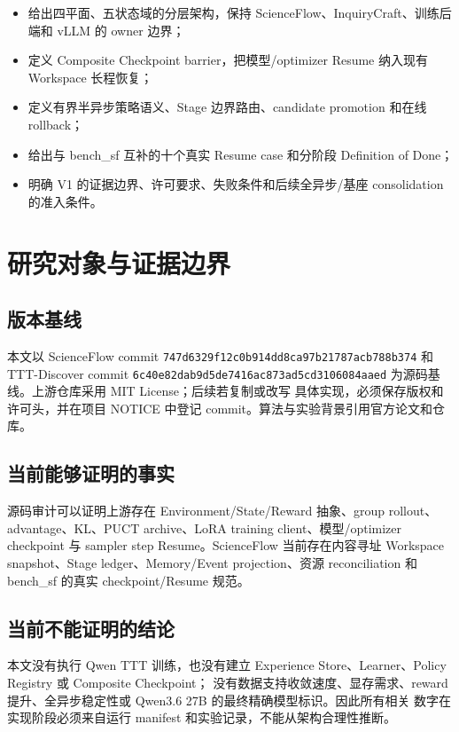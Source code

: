 \documentclass[UTF8,11pt,a4paper]{ctexart}
\begin{document}
\begin{itemize}
  \item 给出四平面、五状态域的分层架构，保持 ScienceFlow、InquiryCraft、训练后端和 vLLM 的 owner 边界；
  \item 定义 Composite Checkpoint barrier，把模型/optimizer Resume 纳入现有 Workspace 长程恢复；
  \item 定义有界半异步策略语义、Stage 边界路由、candidate promotion 和在线 rollback；
  \item 给出与 bench\_sf 互补的十个真实 Resume case 和分阶段 Definition of Done；
  \item 明确 V1 的证据边界、许可要求、失败条件和后续全异步/基座 consolidation 的准入条件。
\end{itemize}

\section{研究对象与证据边界}

\subsection{版本基线}

本文以 ScienceFlow commit
\nolinkurl{747d6329f12c0b914dd8ca97b21787acb788b374} 和 TTT-Discover commit
\nolinkurl{6c40e82dab9d5de7416ac873ad5cd3106084aaed} 为源码基线。上游仓库采用 MIT License；后续若复制或改写
具体实现，必须保存版权和许可头，并在项目 NOTICE 中登记 commit。算法与实验背景引用官方论文和仓库。

\subsection{当前能够证明的事实}

源码审计可以证明上游存在 Environment/State/Reward 抽象、group rollout、advantage、KL、PUCT archive、LoRA
training client、模型/optimizer checkpoint 与 sampler step Resume。ScienceFlow 当前存在内容寻址 Workspace
snapshot、Stage ledger、Memory/Event projection、资源 reconciliation 和 bench\_sf 的真实 checkpoint/Resume
规范\cite{sf-bench,sf-memory,sf-resource}。

\subsection{当前不能证明的结论}

本文没有执行 Qwen TTT 训练，也没有建立 Experience Store、Learner、Policy Registry 或 Composite Checkpoint；
没有数据支持收敛速度、显存需求、reward 提升、全异步稳定性或 Qwen3.6 27B 的最终精确模型标识。因此所有相关
数字在实现阶段必须来自运行 manifest 和实验记录，不能从架构合理性推断。
\end{document}
